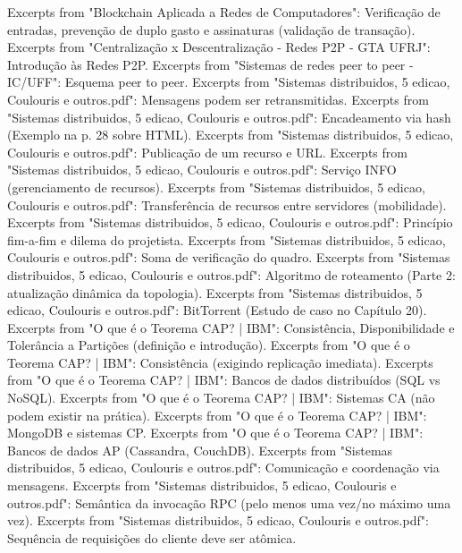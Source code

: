 \documentclass[a4paper,12pt]{article}
\begin{document}
\newpage
\begin{thebibliography}{99}
 Excerpts from "Blockchain Aplicada a Redes de Computadores": Verificação de entradas, prevenção de duplo gasto e assinaturas (validação de transação).
 Excerpts from "Centralização x Descentralização - Redes P2P - GTA UFRJ": Introdução às Redes P2P.
 Excerpts from "Sistemas de redes peer to peer - IC/UFF": Esquema peer to peer.
 Excerpts from "Sistemas distribuidos, 5 edicao, Coulouris e outros.pdf": Mensagens podem ser retransmitidas.
 Excerpts from "Sistemas distribuidos, 5 edicao, Coulouris e outros.pdf": Encadeamento via hash (Exemplo na p. 28 sobre HTML).
 Excerpts from "Sistemas distribuidos, 5 edicao, Coulouris e outros.pdf": Publicação de um recurso e URL.
 Excerpts from "Sistemas distribuidos, 5 edicao, Coulouris e outros.pdf": Serviço INFO (gerenciamento de recursos).
 Excerpts from "Sistemas distribuidos, 5 edicao, Coulouris e outros.pdf": Transferência de recursos entre servidores (mobilidade).
 Excerpts from "Sistemas distribuidos, 5 edicao, Coulouris e outros.pdf": Princípio fim-a-fim e dilema do projetista.
 Excerpts from "Sistemas distribuidos, 5 edicao, Coulouris e outros.pdf": Soma de verificação do quadro.
 Excerpts from "Sistemas distribuidos, 5 edicao, Coulouris e outros.pdf": Algoritmo de roteamento (Parte 2: atualização dinâmica da topologia).
 Excerpts from "Sistemas distribuidos, 5 edicao, Coulouris e outros.pdf": BitTorrent (Estudo de caso no Capítulo 20).
 Excerpts from "O que é o Teorema CAP? | IBM": Consistência, Disponibilidade e Tolerância a Partições (definição e introdução).
 Excerpts from "O que é o Teorema CAP? | IBM": Consistência (exigindo replicação imediata).
 Excerpts from "O que é o Teorema CAP? | IBM": Bancos de dados distribuídos (SQL vs NoSQL).
 Excerpts from "O que é o Teorema CAP? | IBM": Sistemas CA (não podem existir na prática).
 Excerpts from "O que é o Teorema CAP? | IBM": MongoDB e sistemas CP.
 Excerpts from "O que é o Teorema CAP? | IBM": Bancos de dados AP (Cassandra, CouchDB).
 Excerpts from "Sistemas distribuidos, 5 edicao, Coulouris e outros.pdf": Comunicação e coordenação via mensagens.
 Excerpts from "Sistemas distribuidos, 5 edicao, Coulouris e outros.pdf": Semântica da invocação RPC (pelo menos uma vez/no máximo uma vez).
 Excerpts from "Sistemas distribuidos, 5 edicao, Coulouris e outros.pdf": Sequência de requisições do cliente deve ser atômica.

\end{thebibliography}
\end{document}
